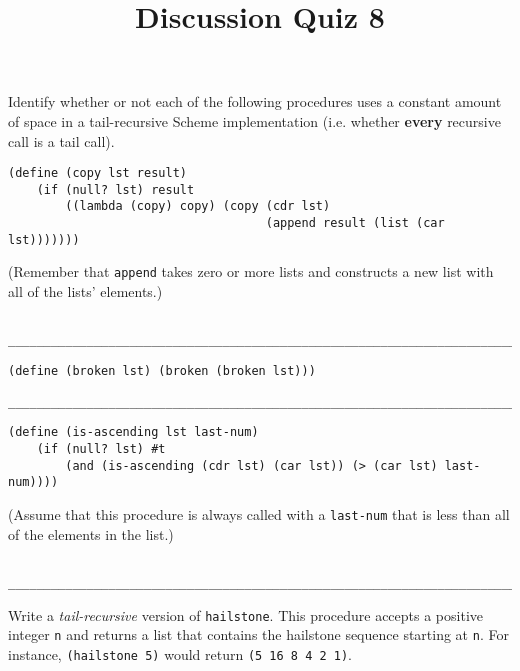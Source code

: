 \documentclass[twoside]{article}
\title{\sc Discussion Quiz 8 \solution{Solutions}}
\begin{document}
\thispagestyle{empty}
\maketitle

\begin{enumerate}

Identify whether or not each of the following procedures uses a constant amount of space in a tail-recursive Scheme implementation (i.e. whether \textbf{every} recursive call is a tail call).

\begin{lstlisting}
(define (copy lst result)
    (if (null? lst) result
        ((lambda (copy) copy) (copy (cdr lst)
                                    (append result (list (car lst)))))))
\end{lstlisting}

(Remember that {\tt append} takes zero or more lists and constructs a new list with all of the lists' elements.)
\begin{lstlisting}

__________________________________________________________________________
\end{lstlisting}

\begin{lstlisting}
(define (broken lst) (broken (broken lst)))
\end{lstlisting}
\vspace{0.21cm}
\begin{lstlisting}
__________________________________________________________________________
\end{lstlisting}

\begin{lstlisting}
(define (is-ascending lst last-num)
    (if (null? lst) #t
        (and (is-ascending (cdr lst) (car lst)) (> (car lst) last-num))))
\end{lstlisting}

(Assume that this procedure is always called with a {\tt last-num} that is less than all of the elements in the list.)
\begin{lstlisting}

__________________________________________________________________________
\end{lstlisting}


Write a \emph{tail-recursive} version of {\tt hailstone}. This procedure accepts a positive integer {\tt n} and returns a list that contains the hailstone sequence starting at {\tt n}. For instance, {\tt (hailstone 5)} would return {\tt (5 16 8 4 2 1)}.


\end{enumerate}
\end{document}

